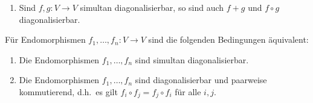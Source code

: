 \begin{example}
  \begin{enumerate}
    \item
      Sind $f, g \colon V \to V$ simultan diagonalisierbar, so sind auch $f + g$ und $f \circ g$ diagonalisierbar.
  \end{enumerate}
\end{example}

\begin{proposition}
  Für Endomorphismen $f_1, \dotsc, f_n \colon V \to V$ sind die folgenden Bedingungen äquivalent:
  \begin{enumerate}
    \item
      Die Endomorphismen $f_1, \dotsc, f_n$ sind simultan diagonalisierbar.
    \item
      Die Endomorphismen $f_1, \dotsc, f_n$ sind diagonalisierbar und paarweise kommutierend, d.h.\ es gilt $f_i \circ  f_j = f_j \circ f_i$ für alle $i, j$.
  \end{enumerate}
\end{proposition}